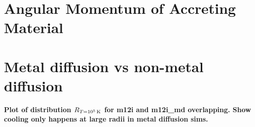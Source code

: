 \documentclass[fleqn,usenatbib]{mnras}
\newcommand{\Rcool}{R_{T=10^5\,{\rm K}}}
\begin{document}



\appendix

\section{Angular Momentum of Accreting Material}


\section{Metal diffusion vs non-metal diffusion}

\textbf{Plot of distribution $\Rcool$ for m12i and m12i\_md overlapping. Show cooling only happens at large radii in metal diffusion sims.}



\bsp	%
\label{lastpage}
\end{document}
